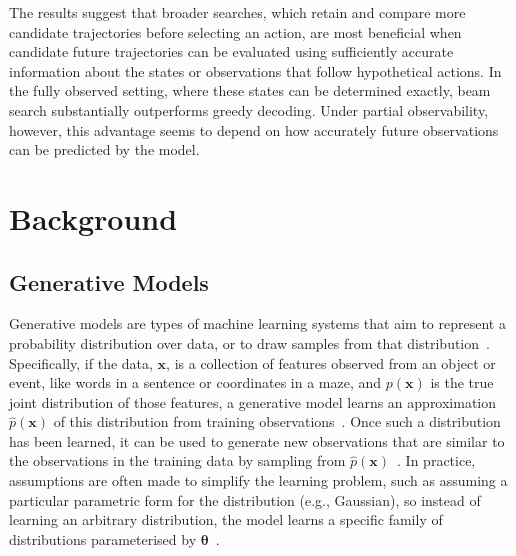 ﻿\documentclass[12pt,a4paper]{article}
\let\oldcite\cite
\renewcommand{\cite}[1]{\mbox{\oldcite{#1}}}
\theoremstyle{definition}
\begin{document}
The results suggest that broader searches, which retain and compare more candidate 
trajectories before selecting an action, are most beneficial when candidate future
trajectories can be evaluated using sufficiently accurate information about the states or 
observations that follow hypothetical actions. In the fully observed setting, where these 
states can be determined exactly, beam search substantially outperforms greedy decoding. 
Under partial observability, however, this
advantage seems to depend on how accurately future
observations can be predicted by the model.


\section{Background}
\subsection{Generative Models}
Generative models are types of machine learning systems that aim to represent a probability distribution over data,
or to draw samples from that distribution~\cite{goodfellow2016deep}.
Specifically, if the data, $\mathbf{x}$, is a collection of features observed from an object or event, like words in a sentence or coordinates in a maze, and $p(\mathbf{x})$ is the true joint distribution of those features, a generative model learns an approximation $\hat{p}(\mathbf{x})$ of this distribution from training observations~\cite{goodfellow2016deep}.
Once such a distribution has been learned, it can be used to generate new observations that are similar to the observations in the training data by sampling from $\hat{p}(\mathbf{x})$~\cite{goodfellow2016deep}.
In practice, assumptions are often made to simplify the learning problem, such as assuming a 
particular parametric form for the distribution (e.g., Gaussian), so instead of learning an arbitrary 
distribution, the model learns a specific family of distributions parameterised by $\boldsymbol{\theta}$~\cite{goodfellow2016deep}. 
\end{document}
